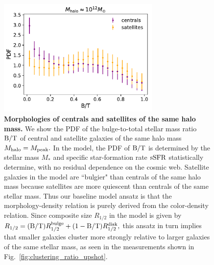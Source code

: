 \documentclass[usenatbib,usegraphicx,letterpaper]{mn2e}
\newcommand{\rhalf}{R_{1/2}}
\newcommand{\rhalfdisk}{R_{1/2}^{\rm disk}}
\newcommand{\rhalfbulge}{R_{1/2}^{\rm bulge}}
\newcommand{\bt}{{\rm B/T}}
\newcommand{\mstar}{M_{\ast}}
\newcommand{\ssfr}{{\rm sSFR}}
\newcommand{\mpeak}{M_{\rm peak}}
\newcommand{\mhalo}{M_{\rm halo}}
\begin{document}
\begin{figure}
\centering
\includegraphics[width=8cm]{FIGS/random_bt_centrals_vs_satellites.pdf}
\caption{
{\bf Morphologies of centrals and satellites of the same halo mass.} We show the PDF of the bulge-to-total stellar mass ratio $\bt$ of central and satellite galaxies of the same halo mass $\mhalo=\mpeak.$ In the model, the PDF of $\bt$ is determined by the stellar mass $\mstar$ and specific star-formation rate $\ssfr$ statistically determine, with no residual dependence on the cosmic web. Satellite galaxies in the model are ``bulgier" than centrals of the same halo mass because satellites are more quiescent than centrals of the same stellar mass. Thus our baseline model ansatz is that the morphology-density relation is purely derived from the color-density relation. Since composite size $\rhalf$ in the model is given by $\rhalf=(\bt)\rhalfbulge + (1-\bt)\rhalfdisk,$ this ansatz in turn implies that smaller galaxies cluster more strongly relative to larger galaxies of the same stellar mass, as seen in the measurements shown in Fig.~\ref{fig:clustering_ratio_upshot}. 
}
\label{fig:bt_censat}
\end{figure}
\end{document}
